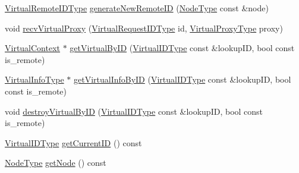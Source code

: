 \begin{DoxyCompactItemize}
\item 
\hyperlink{namespacevt_1_1vrt_a8184ab8c530ce523edcdc4f4c38565be}{Virtual\+Remote\+I\+D\+Type} \hyperlink{structvt_1_1vrt_1_1_virtual_context_manager_a9d5b94f32defc2e563ebf8ad54bb3164}{generate\+New\+Remote\+ID} (\hyperlink{namespacevt_a866da9d0efc19c0a1ce79e9e492f47e2}{Node\+Type} const \&node)
\item 
void \hyperlink{structvt_1_1vrt_1_1_virtual_context_manager_ab79342508fe36427b54e3d94297e223a}{recv\+Virtual\+Proxy} (\hyperlink{namespacevt_1_1vrt_ac7ef8820ebfc383fa16f09bf46eaa2b8}{Virtual\+Request\+I\+D\+Type} id, \hyperlink{namespacevt_a1b417dd5d684f045bb58a0ede70045ac}{Virtual\+Proxy\+Type} proxy)
\item 
\hyperlink{structvt_1_1vrt_1_1_virtual_context}{Virtual\+Context} $\ast$ \hyperlink{structvt_1_1vrt_1_1_virtual_context_manager_a7e586415b9dd42012cc71134d2b5fd30}{get\+Virtual\+By\+ID} (\hyperlink{namespacevt_1_1vrt_a84d0891f52f70728c3fc2172cffb464b}{Virtual\+I\+D\+Type} const \&lookup\+ID, bool const is\+\_\+remote)
\item 
\hyperlink{structvt_1_1vrt_1_1_virtual_context_manager_ad2cd828dbd8886166b4ceb3776c49239}{Virtual\+Info\+Type} $\ast$ \hyperlink{structvt_1_1vrt_1_1_virtual_context_manager_aa05f4cec5679a32e0af06fc8283996e1}{get\+Virtual\+Info\+By\+ID} (\hyperlink{namespacevt_1_1vrt_a84d0891f52f70728c3fc2172cffb464b}{Virtual\+I\+D\+Type} const \&lookup\+ID, bool const is\+\_\+remote)
\item 
void \hyperlink{structvt_1_1vrt_1_1_virtual_context_manager_a00ec944a1360a3f4a13ecfe965c22b36}{destroy\+Virtual\+By\+ID} (\hyperlink{namespacevt_1_1vrt_a84d0891f52f70728c3fc2172cffb464b}{Virtual\+I\+D\+Type} const \&lookup\+ID, bool const is\+\_\+remote)
\item 
\hyperlink{namespacevt_1_1vrt_a84d0891f52f70728c3fc2172cffb464b}{Virtual\+I\+D\+Type} \hyperlink{structvt_1_1vrt_1_1_virtual_context_manager_ad5d3f15d0882e273bf55a48610667881}{get\+Current\+ID} () const
\item 
\hyperlink{namespacevt_a866da9d0efc19c0a1ce79e9e492f47e2}{Node\+Type} \hyperlink{structvt_1_1vrt_1_1_virtual_context_manager_ac51ab2c1e35782eeace3c1aaf297214e}{get\+Node} () const
\end{DoxyCompactItemize}
